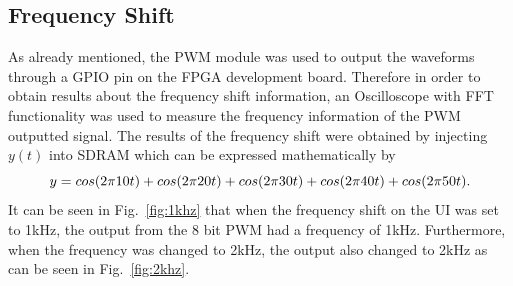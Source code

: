 \subsection{Frequency Shift}
	\noindent As already mentioned, the PWM module was used to output the waveforms through a GPIO pin on the FPGA development board. Therefore in order to obtain results about the frequency shift information, an Oscilloscope with FFT functionality was used to measure the frequency information of the PWM outputted signal. The results of the frequency shift were obtained by injecting $y(t)$ into SDRAM which can be expressed mathematically by
		\begin{equation}\footnotesize 
			y = cos(2\pi 10t) + cos(2\pi 20t)  + cos(2\pi 30t) + cos(2\pi 40t)+cos(2\pi 50t). \\
		\end{equation}
	\noindent It can be seen in Fig.~\ref{fig:1khz} that when the frequency shift on the UI was set to 1kHz, the output from the 8 bit PWM had a frequency of 1kHz. Furthermore, when the frequency was changed to 2kHz, the output also changed to 2kHz as can be seen in Fig.~\ref{fig:2khz}.
